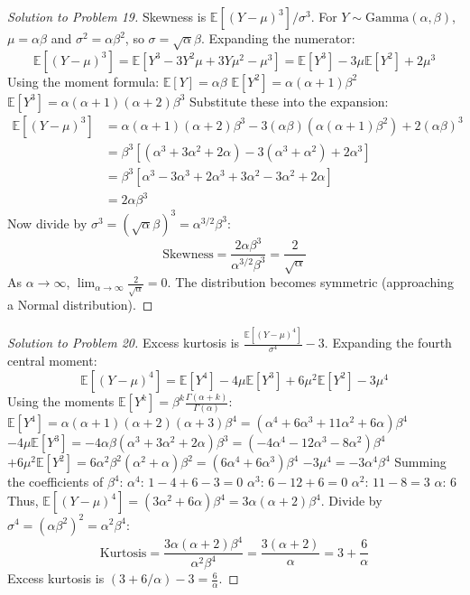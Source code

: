 \documentclass[11pt, a4paper]{article}
\theoremstyle{definition}
\theoremstyle{remark}
\newcommand{\E}{\mathbb{E}}
\begin{document}
\begin{proof}[Solution to Problem 19]
Skewness is $\E[(Y - \mu)^3] / \sigma^3$. For $Y \sim \text{Gamma}(\alpha, \beta)$, $\mu = \alpha\beta$ and $\sigma^2 = \alpha\beta^2$, so $\sigma = \sqrt{\alpha}\beta$.
Expanding the numerator:
\[ \E[(Y - \mu)^3] = \E[Y^3 - 3Y^2\mu + 3Y\mu^2 - \mu^3] = \E[Y^3] - 3\mu\E[Y^2] + 2\mu^3 \]
Using the moment formula:
$\E[Y] = \alpha\beta$
$\E[Y^2] = \alpha(\alpha+1)\beta^2$
$\E[Y^3] = \alpha(\alpha+1)(\alpha+2)\beta^3$
Substitute these into the expansion:
\begin{align*}
\E[(Y - \mu)^3] &= \alpha(\alpha+1)(\alpha+2)\beta^3 - 3(\alpha\beta)(\alpha(\alpha+1)\beta^2) + 2(\alpha\beta)^3 \\
&= \beta^3 [ (\alpha^3 + 3\alpha^2 + 2\alpha) - 3(\alpha^3 + \alpha^2) + 2\alpha^3 ] \\
&= \beta^3 [ \alpha^3 - 3\alpha^3 + 2\alpha^3 + 3\alpha^2 - 3\alpha^2 + 2\alpha ] \\
&= 2\alpha\beta^3
\end{align*}
Now divide by $\sigma^3 = (\sqrt{\alpha}\beta)^3 = \alpha^{3/2}\beta^3$:
\[ \text{Skewness} = \frac{2\alpha\beta^3}{\alpha^{3/2}\beta^3} = \frac{2}{\sqrt{\alpha}} \]
As $\alpha \to \infty$, $\lim_{\alpha \to \infty} \frac{2}{\sqrt{\alpha}} = 0$. The distribution becomes symmetric (approaching a Normal distribution).
\end{proof}

\begin{proof}[Solution to Problem 20]
Excess kurtosis is $\frac{\E[(Y - \mu)^4]}{\sigma^4} - 3$.
Expanding the fourth central moment:
\[ \E[(Y - \mu)^4] = \E[Y^4] - 4\mu\E[Y^3] + 6\mu^2\E[Y^2] - 3\mu^4 \]
Using the moments $\E[Y^k] = \beta^k \frac{\Gamma(\alpha+k)}{\Gamma(\alpha)}$:
$\E[Y^4] = \alpha(\alpha+1)(\alpha+2)(\alpha+3)\beta^4 = (\alpha^4 + 6\alpha^3 + 11\alpha^2 + 6\alpha)\beta^4$
$-4\mu\E[Y^3] = -4\alpha\beta(\alpha^3 + 3\alpha^2 + 2\alpha)\beta^3 = (-4\alpha^4 - 12\alpha^3 - 8\alpha^2)\beta^4$
$+6\mu^2\E[Y^2] = 6\alpha^2\beta^2(\alpha^2 + \alpha)\beta^2 = (6\alpha^4 + 6\alpha^3)\beta^4$
$-3\mu^4 = -3\alpha^4\beta^4$
Summing the coefficients of $\beta^4$:
$\alpha^4$: $1 - 4 + 6 - 3 = 0$
$\alpha^3$: $6 - 12 + 6 = 0$
$\alpha^2$: $11 - 8 = 3$
$\alpha$: $6$
Thus, $\E[(Y - \mu)^4] = (3\alpha^2 + 6\alpha)\beta^4 = 3\alpha(\alpha+2)\beta^4$.
Divide by $\sigma^4 = (\alpha\beta^2)^2 = \alpha^2\beta^4$:
\[ \text{Kurtosis} = \frac{3\alpha(\alpha+2)\beta^4}{\alpha^2\beta^4} = \frac{3(\alpha+2)}{\alpha} = 3 + \frac{6}{\alpha} \]
Excess kurtosis is $(3 + 6/\alpha) - 3 = \frac{6}{\alpha}$.
\end{proof}
\end{document}
